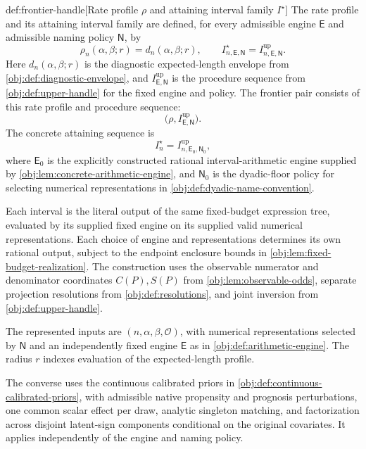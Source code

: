 \begin{definitionv}{def:frontier-handle}[Rate profile $\rho$ and attaining interval family $I^\star$]
The rate profile and its attaining interval family are defined, for every admissible engine \(\mathsf E\) and admissible naming policy \(\mathsf N\), by
\[
\rho_n(\alpha,\beta;r)=d_n(\alpha,\beta;r),
\qquad
I^\star_{n,\mathsf E,\mathsf N}
=
I^{\mathrm{up}}_{n,\mathsf E,\mathsf N}.
\]
Here \(d_n(\alpha,\beta;r)\) is the diagnostic expected-length envelope from \cref{obj:def:diagnostic-envelope}, and \(I^{\mathrm{up}}_{\mathsf E,\mathsf N}\) is the procedure sequence from \cref{obj:def:upper-handle} for the fixed engine and policy. The frontier pair consists of this rate profile and procedure sequence:
\[
\bigl(\rho,I^{\mathrm{up}}_{\mathsf E,\mathsf N}\bigr).
\]
The concrete attaining sequence is
\[
I_n^\star
=
I^{\mathrm{up}}_{n,\mathsf E_0,\mathsf N_0},
\]
where \(\mathsf E_0\) is the explicitly constructed rational interval-arithmetic engine supplied by \cref{obj:lem:concrete-arithmetic-engine}, and \(\mathsf N_0\) is the dyadic-floor policy for selecting numerical representations in \cref{obj:def:dyadic-name-convention}.

Each interval is the literal output of the same fixed-budget expression tree, evaluated by its supplied fixed engine on its supplied valid numerical representations. Each choice of engine and representations determines its own rational output, subject to the endpoint enclosure bounds in \cref{obj:lem:fixed-budget-realization}. The construction uses the observable numerator and denominator coordinates \(C(P),S(P)\) from \cref{obj:lem:observable-odds}, separate projection resolutions from \cref{obj:def:resolutions}, and joint inversion from \cref{obj:def:upper-handle}.

The represented inputs are \((n,\alpha,\beta,\mathcal O)\), with numerical representations selected by \(\mathsf N\) and an independently fixed engine \(\mathsf E\) as in \cref{obj:def:arithmetic-engine}. The radius \(r\) indexes evaluation of the expected-length profile.

The converse uses the continuous calibrated priors in \cref{obj:def:continuous-calibrated-priors}, with admissible native propensity and prognosis perturbations, one common scalar effect per draw, analytic singleton matching, and factorization across disjoint latent-sign components conditional on the original covariates. It applies independently of the engine and naming policy.


\end{definitionv}
